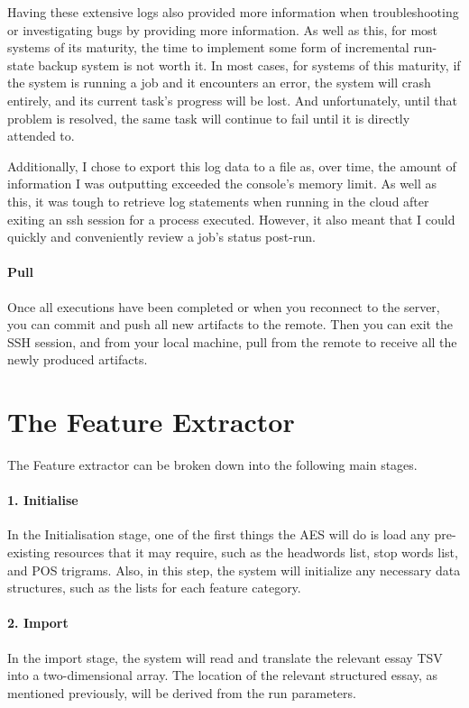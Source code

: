 Having these extensive logs also provided more information when troubleshooting or investigating bugs by providing more information. As well as this, for most systems of its maturity, the time to implement some form of incremental run-state backup system is not worth it. In most cases, for systems of this maturity, if the system is running a job and it encounters an error, the system will crash entirely, and its current task's progress will be lost. And unfortunately, until that problem is resolved, the same task will continue to fail until it is directly attended to.

Additionally, I chose to export this log data to a file as, over time, the amount of information I was outputting exceeded the console's memory limit. As well as this, it was tough to retrieve log statements when running in the cloud after exiting an ssh session for a process executed. However, it also meant that I could quickly and conveniently review a job's status post-run.

\paragraph{Pull} Once all executions have been completed or when you reconnect to the server, you can commit and push all new artifacts to the remote. Then you can exit the SSH session, and from your local machine, pull from the remote to receive all the newly produced artifacts.

\section{The Feature Extractor}

The Feature extractor can be broken down into the following main stages.

\paragraph{1. Initialise } In the Initialisation stage, one of the first things the AES will do is load any pre-existing resources that it may require, such as the headwords list, stop words list, and POS trigrams. Also, in this step, the system will initialize any necessary data structures, such as the lists for each feature category.

\paragraph{2. Import} In the import stage, the system will read and translate the relevant essay TSV into a two-dimensional array. The location of the relevant structured essay, as mentioned previously, will be derived from the run parameters.

